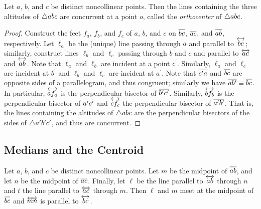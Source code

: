 \begin{prop}
Let \(a\), \(b\), and \(c\) be distinct noncollinear points.
Then the lines containing the three altitudes of \(\bigtriangleup{abc}\) are concurrent at a point \(o\), called the \emph{orthocenter} of \(\bigtriangleup{abc}\).
\end{prop}

\begin{proof}
Construct the feet \(f_a\), \(f_b\), and \(f_c\) of \(a\), \(b\), and \(c\) on \(\overline{bc}\), \(\overline{ac}\), and \(\overline{ab}\), respectively.
Let \(\ell_a\) be the (unique) line passing through \(a\) and parallel to \(\overleftrightarrow{bc}\); similarly, construct lines \(\ell_b\) and \(\ell_c\) passing through \(b\) and \(c\) and parallel to \(\overleftrightarrow{ac}\) and \(\overleftrightarrow{ab}\).
Note that \(\ell_a\) and \(\ell_b\) are incident at a point \(c^\prime\).
Similarly, \(\ell_a\) and \(\ell_c\) are incident at \(b^\prime\) and \(\ell_b\) and \(\ell_c\) are incident at \(a^\prime\).
Note that \(\overline{c^\prime a}\) and \(\overline{bc}\) are opposite sides of a parallelogram, and thus congruent; similarly we have \(\overline{ab^\prime} \equiv \overline{bc}\).
In particular, \(\overleftrightarrow{af_a}\) is the perpendicular bisector of \(\overline{b^\prime c^\prime}\).
Similarly, \(\overleftrightarrow{bf_b}\) is the perpendicular bisector of \(\overline{a^\prime c^\prime}\) and \(\overleftrightarrow{cf_c}\) the perpendicular bisector of \(\overline{a^\prime b^\prime}\).
That is, the lines containing the altitudes of \(\bigtriangleup{abc}\) are the perpendicular bisectors of the sides of \(\bigtriangleup{a^\prime b^\prime c^\prime}\), and thus are concurrent.
\end{proof}

\subsection*{Medians and the Centroid}

\begin{prop}
Let \(a\), \(b\), and \(c\) be distinct noncollinear points.
Let \(m\) be the midpoint of \(\overline{ab}\), and let \(n\) be the midpoint of \(\overline{ac}\).
Finally, let \(\ell\) be the line parallel to \(\overleftrightarrow{ab}\) through \(n\) and \(t\) the line parallel to \(\overleftrightarrow{ac}\) through \(m\).
Then \(\ell\) and \(m\) meet at the midpoint of \(\overline{bc}\) and \(\overleftrightarrow{mn}\) is parallel to \(\overleftrightarrow{bc}\).
\end{prop}

